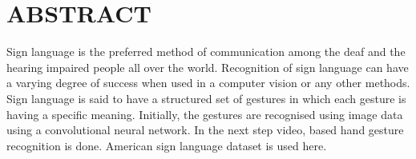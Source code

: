 \chapter*{\rm \large \bf ABSTRACT}
\vspace{4.0mm}
\setlength{\parindent}{4em}

\par
Sign language is the preferred method of communication among the deaf and the hearing impaired people all over the world. Recognition of sign language can have a varying degree of success when used in a computer vision or any other methods. Sign language is said to have a structured set of gestures in which each gesture is having a specific meaning.
Initially, the gestures are recognised using image data using a convolutional neural network.  In the next step video, based hand gesture recognition is done.  
American sign language dataset is used here. 

\newpage 
